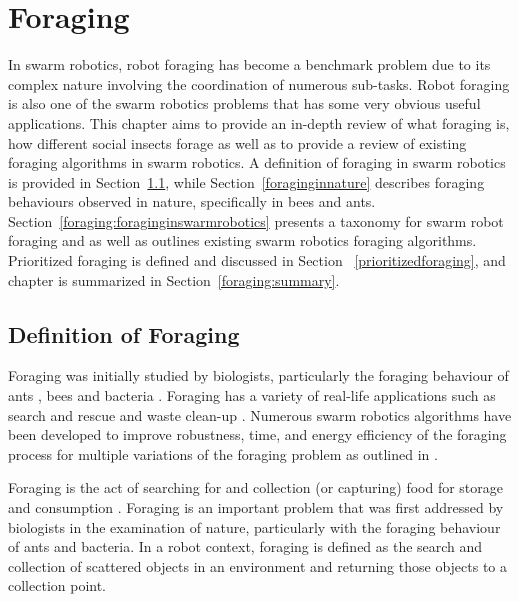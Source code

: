 
\chapter{Foraging}
\label{chap:second}


In swarm robotics, robot foraging has become a benchmark problem due to its complex nature involving the coordination of numerous sub-tasks. Robot foraging is also one of the swarm robotics problems that has some very obvious useful applications. This chapter aims to provide an in-depth review of what foraging is, how different social insects forage as well as to provide a review of existing foraging algorithms in swarm robotics. A definition of foraging in swarm robotics is provided in Section~\ref{sec:second:definition}, while Section~\ref{foraginginnature} describes foraging behaviours observed in nature, specifically in bees and ants. Section~\ref{foraging:foraginginswarmrobotics} presents a taxonomy for swarm robot foraging and as well as outlines existing swarm robotics foraging algorithms. Prioritized foraging is defined and discussed in Section~
\ref{prioritizedforaging}, and chapter is summarized in Section~\ref{foraging:summary}.



\section{Definition of Foraging}
\label{sec:second:definition}

Foraging was initially studied by biologists, particularly the foraging behaviour of ants \cite{holldobler1990ants,bernstein1974seasonal}, bees \cite{seeley2009wisdom} and bacteria \cite{resnick1994turtles}. Foraging has a variety of real-life applications such as search and rescue \cite{jennings1997cooperative,murphy2000biomimetic} and waste clean-up \cite{balch1995io}. Numerous swarm robotics algorithms have been developed to improve robustness, time, and energy efficiency of the foraging process for multiple variations of the foraging problem as outlined in \cite{winfield2009foraging}. 

Foraging is the act of searching for and collection (or capturing) food for storage and consumption \cite{winfield2009foraging}. Foraging is an important problem that was first addressed by biologists in the examination of nature, particularly with the foraging behaviour of ants and bacteria. In a robot context, foraging is defined as the search and collection of scattered objects in an environment and returning those objects to a collection point.


